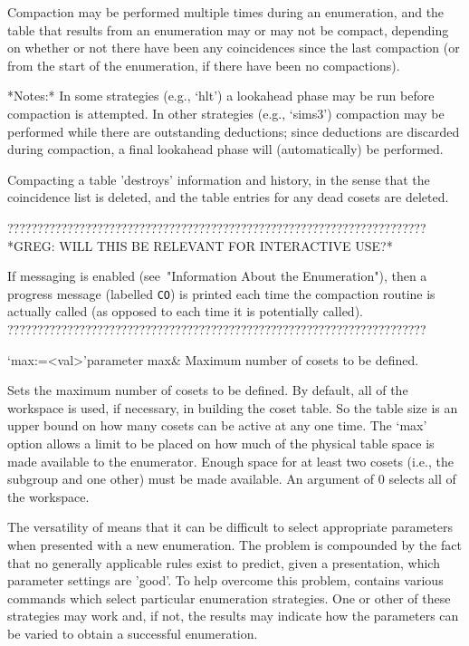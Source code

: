 Compaction may be performed  multiple times during an enumeration, and
the table that results from an  enumeration may or may not be compact,
depending on whether or not there have been any coincidences since the
last compaction (or  from the start of the  enumeration, if there have
been no compactions).

*Notes:*
In some strategies  (e.g., `hlt') a lookahead phase  may be run before
compaction  is   attempted.   In  other   strategies  (e.g.,  `sims3')
compaction may  be performed  while there are  outstanding deductions;
since deductions  are discarded  during compaction, a  final lookahead
phase will (automatically) be performed.

Compacting a  table 'destroys' information  and history, in  the sense
that the  coincidence list is deleted,  and the table  entries for any
dead cosets are deleted.

??????????????????????????????????????????????????????????????????????
*GREG:
WILL THIS BE RELEVANT FOR INTERACTIVE USE?*

If  messaging is  enabled (see~"Information  About  the Enumeration"),
then a progress  message (labelled {\tt CO}) is  printed each time the
compaction routine is  actually called (as opposed to  each time it is
potentially called).
??????????????????????????????????????????????????????????????????????


\>`max:=<val>'{parameter max}&
Maximum number of cosets to be defined.

Sets the maximum  number of cosets to be defined.   By default, all of
the workspace is used, if  necessary, in building the coset table.  So
the table size is  an upper bound on how many cosets  can be active at
any one  time.  The `max'  option allows a  limit to be placed  on how
much of the physical table  space is made available to the enumerator.
Enough  space for  at least  two cosets  (i.e., the  subgroup  and one
other) must  be made available.  An  argument of 0 selects  all of the
workspace.

\enditems



The versatility  of {\ACE}  means that it  can be difficult  to select
appropriate  parameters when  presented with  a new  enumeration.  The
problem is compounded  by the fact that no  generally applicable rules
exist to  predict, given a presentation, which  parameter settings are
'good'.   To  help  overcome  this problem,  {\ACE}  contains  various
commands which select particular enumeration strategies.  One or other
of these strategies may work and, if not, the results may indicate how
the parameters can be varied  to obtain a successful enumeration.  

